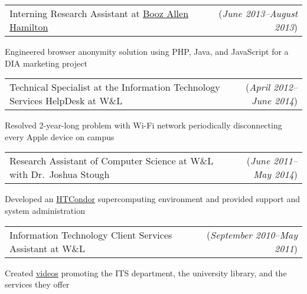 \documentclass[11pt, letterpaper]{letter}
\makeatletter
\newlength{\indwidth}            \setlength{\indwidth}{\textwidth-.4in}
\newcommand{\dated}[2]{
    \begin{tabular*}{\indwidth}{l@{\extracolsep{\fill}}r}
        #1 & (\textit{#2})
    \end{tabular*}
}
\newcommand{\datedTwo}[3]{
    \begin{tabular*}{\indwidth}{l@{\extracolsep{\fill}}r}
        #1 & (\textit{#2}) (\textit{#3})
    \end{tabular*}
}
\newcommand{\BAH}{\href{https://www.boozallen.com/}{Booz Allen Hamilton}}
\newcommand{\HTCondor}{\href{https://htcondor.org/}{HTCondor}}
\makeatother
\begin{document}
\begin{compactitem}
\begin{compactitem}
        \end{compactitem}
    \item \dated{Interning Research Assistant at \BAH}{June 2013--August 2013}
        \begin{compactitem}
            \item Engineered browser anonymity solution using PHP, Java, and JavaScript for a DIA marketing project
        \end{compactitem}
    \item \dated{Technical Specialist at the Information Technology Services HelpDesk at W\&L}{April 2012--June 2014}
        \begin{compactitem}
        \item Resolved 2-year-long problem with Wi-Fi network periodically disconnecting every Apple device on campus
        \end{compactitem}
    \item \dated{Research Assistant of Computer Science at W\&L with Dr.\ Joshua Stough}{June 2011--May 2014}
        \begin{compactitem}
        \item Developed an \HTCondor{} supercomputing environment and provided support and system administration
        \end{compactitem}
    \item \dated{Information Technology Client Services Assistant at W\&L}{September 2010--May 2011}
        \begin{compactitem}
        \item Created \href{https://youtu.be/NvOarFOmly0}{videos} promoting the ITS department, the  university library,
            and the services they offer
        \end{compactitem}
    \iftoggle{smithbros}{%
        \item \datedTwo{%
                File Digitizer at Smith Brothers Abstract and Title Co.
            }{June 2009--August 2009}{June 2010--August 2010}
    }{}
\end{compactitem}
\end{document}
